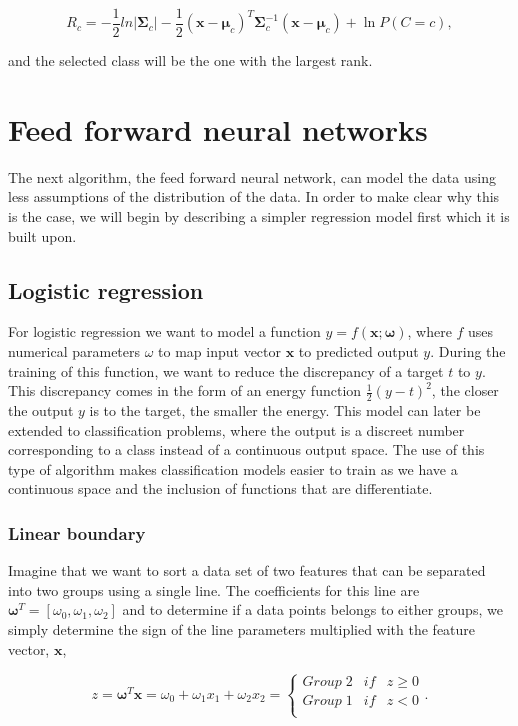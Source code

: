 \begin{equation}
    R_c = -\frac{1}{2}ln{|\bm{\Sigma}_c|}-\frac{1}{2}(\bm{x}-\bm{\mu}_c)^{T}\bm{\Sigma}_c^{-1}(\bm{x}-\bm{\mu}_c)+\ln{P(C=c)},
\end{equation}

and the selected class will be the one with the largest rank.

\section{Feed forward neural networks}

The next algorithm, the feed forward neural network, can model the data using less assumptions of the distribution of the data. In order to make clear why this is the case, we will begin by describing a simpler regression model first which it is built upon.

\subsection{Logistic regression}

For logistic regression we want to model a function $y=f(\bm{x};\bm{\omega})$, where $f$ uses numerical parameters $\omega$ to map input vector $\bm{x}$ to predicted output $y$. During the training of this function, we want to reduce the discrepancy of a target $t$ to $y$. This discrepancy comes in the form of an energy function $\frac{1}{2}\left(y-t\right)^2$, the closer the output $y$ is to the target, the smaller the energy. This model can later be extended to classification problems, where the output is a discreet number corresponding to a class instead of a continuous output space. The use of this type of algorithm makes classification models easier to train as we have a continuous space and the inclusion of functions that are differentiate.

\subsubsection{Linear boundary}

Imagine that we want to sort a data set of two features that can be separated into two groups using a single line. The coefficients for this line are $\bm{\omega}^{T}=[\omega_0,\omega_1, \omega_2]$ and to determine if a data points belongs to either groups, we simply determine the sign of the line parameters multiplied with the feature vector, $\bm{x}$,

\begin{equation}
    z=\bm{\omega}^T\bm{x}=\omega_0+\omega_1 x_1 + \omega_2 x_2 = \left\{
    \begin{array}{ccc}
        Group\;2 & if & z \geq 0 \\
        Group\;1 & if & z < 0 \\
    \end{array}
    \right. .
\end{equation}

